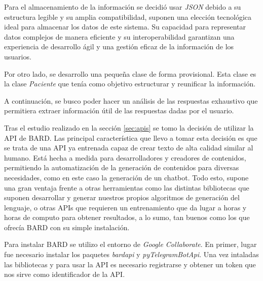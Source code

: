 Para el almacenamiento de la información se decidió usar \textit{JSON} debido a su estructura legible y su amplia compatibilidad, suponen una elección tecnológica ideal para almacenar los datos de este sistema. Su capacidad para representar datos complejos de manera eficiente y su interoperabilidad garantizan una experiencia de desarrollo ágil y una gestión eficaz de la información de los usuarios. 

Por otro lado, se desarrollo una pequeña clase de forma provisional. Esta clase es la clase \textit{Paciente} que tenía como objetivo estructurar y reunificar la información.

A continuación, se busco poder hacer un análisis de las respuestas exhaustivo que permitiera extraer información útil de las respuestas dadas por el usuario.

Tras el estudio realizado en la sección \ref{sec:apis} se tomo la decisión de utilizar la API de BARD. Las principal característica que llevo a tomar esta decisión es que se trata de una API ya entrenada capaz de crear texto de alta calidad similar al humano. Está hecha a medida para desarrolladores y creadores de contenidos, permitiendo la automatización de la generación de contenidos para diversas necesidades, como en este caso la generación de un chatbot. Todo esto, supone una gran ventaja frente a otras herramientas como las distintas bibliotecas que suponen desarrollar y generar nuestros propios algoritmos de generación del lenguaje, o otras APIs que requieren un entrenamiento que da lugar a horas y horas de computo para obtener resultados, a lo sumo, tan buenos como los que ofrecía BARD con su simple instalación. 

Para instalar BARD se utilizo el entorno de \textit{Google Collaborate}. En primer, lugar fue necesario instalar los paquetes \textit{bardapi} y \textit{pyTelegramBotApi}. Una vez intaladas las bibliotecas y para usar la API es necesario registrarse y obtener un token que nos sirve como identificador de la API. 

